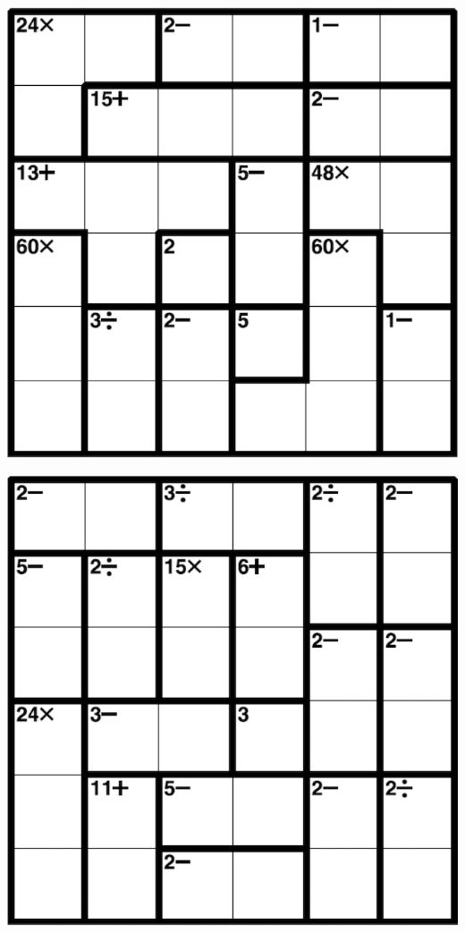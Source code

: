 
\includegraphics[scale=1]{Gambar/Lampiran/6x6_13.png}

\includegraphics[scale=1]{Gambar/Lampiran/6x6_14.png}
